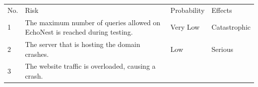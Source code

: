 \documentclass[]{article}
\begin{document}
\begin{longtable}[c]{@{}llll@{}}
\toprule\addlinespace
\begin{minipage}[t]{0.22\columnwidth}\raggedright
No.
\end{minipage} & \begin{minipage}[t]{0.22\columnwidth}\raggedright
Risk
\end{minipage} & \begin{minipage}[t]{0.22\columnwidth}\raggedright
Probability
\end{minipage} & \begin{minipage}[t]{0.22\columnwidth}\raggedright
Effects
\end{minipage}
\\\addlinespace
\begin{minipage}[t]{0.22\columnwidth}\raggedright
1
\end{minipage} & \begin{minipage}[t]{0.22\columnwidth}\raggedright
The maximum number of queries allowed on EchoNest is reached during
testing.
\end{minipage} & \begin{minipage}[t]{0.22\columnwidth}\raggedright
Very Low
\end{minipage} & \begin{minipage}[t]{0.22\columnwidth}\raggedright
Catastrophic
\end{minipage}
\\\addlinespace
\begin{minipage}[t]{0.22\columnwidth}\raggedright
2
\end{minipage} & \begin{minipage}[t]{0.22\columnwidth}\raggedright
The server that is hosting the domain crashes.
\end{minipage} & \begin{minipage}[t]{0.22\columnwidth}\raggedright
Low
\end{minipage} & \begin{minipage}[t]{0.22\columnwidth}\raggedright
Serious
\end{minipage}
\\\addlinespace
\begin{minipage}[t]{0.22\columnwidth}\raggedright
3
\end{minipage} & \begin{minipage}[t]{0.22\columnwidth}\raggedright
The website traffic is overloaded, causing a crash.
\end{minipage} & \begin{minipage}[t]{0.22\columnwidth}\raggedright

\end{minipage}
\end{longtable}
\end{document}
